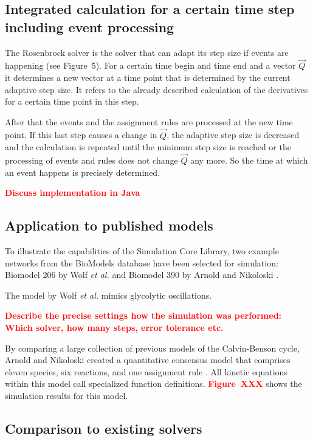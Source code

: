 \documentclass[10pt]{bmc_article}
\newenvironment{bmcformat}{\baselineskip20pt\sloppy\setboolean{publ}{false}}{\baselineskip20pt\sloppy}
\newcommand{\TODO}[1]{\textcolor{red}{\textbf{#1}}}
\begin{document}
\begin{bmcformat}
\subsection*{Integrated calculation for a certain time step including event processing}
The Rosenbrock solver is the solver that can adapt its step size if events are happening (see Figure~5). For a certain time begin and time end and a vector $\vec{Q}$ it determines a new vector at a time point that is determined by the current adaptive step size. It refers to the already described calculation of the derivatives for a certain time point in this step.

After that the events and the assignment rules are processed at the new time point. If this last step causes a change in $\vec{Q}$, the adaptive step size is decreased and the calculation is repeated until the minimum step size is reached or the processing of events and rules does not change $\vec{Q}$ any more. So the time at which an event happens is precisely determined.

\TODO{Discuss implementation in Java}

\subsection*{Application to published models}

To illustrate the capabilities of the Simulation Core Library, two example
networks from the BioModels database have been selected for simulation:
Biomodel 206 by Wolf \emph{et al.} \cite{Wolf2000} and
Biomodel 390 by Arnold and Nikoloski \cite{Arnold2011}.

The model by Wolf \emph{et al.} \cite{Wolf2000} mimics glycolytic oscillations.

\TODO{Describe the precise settings how the simulation was performed: Which
solver, how many steps, error tolerance etc.}

By comparing a large collection of previous models of the Calvin-Benson
cycle, Arnold and Nikoloski created a quantitative consensus model that
comprises eleven species, six reactions, and one assignment rule
\cite{Arnold2011}.
All kinetic equations within this model call specialized function definitions.
\TODO{Figure~XXX} shows the simulation results for this model.

\subsection*{Comparison to existing solvers}


\end{bmcformat}
\end{document}
